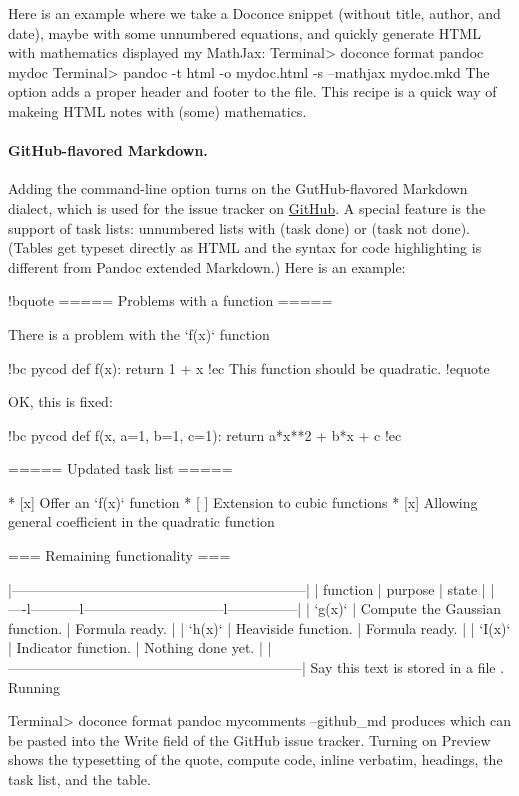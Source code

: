 \documentclass[%
oneside,                 %
final,                   %
10pt]{article}
\begin{document}
Here is an example where we take a Doconce snippet (without title, author,
and date), maybe with some unnumbered equations, and quickly generate
HTML with mathematics displayed my MathJax:
\bsys
Terminal> doconce format pandoc mydoc
Terminal> pandoc -t html -o mydoc.html -s --mathjax mydoc.mkd
\esys
The  option adds a proper header and footer to the  file.
This recipe is a quick way of makeing HTML notes with (some) mathematics.

\paragraph{GitHub-flavored Markdown.}
Adding the command-line option  turns on the GutHub-flavored
Markdown dialect, which is used for the issue tracker on \href{{http://github.com}}{GitHub}. A special feature is the support of task lists:
unnumbered lists with \code{[x]} (task done) or \code{[ ]} (task not done).
(Tables get typeset directly as HTML and the syntax for code highlighting
is different from Pandoc extended Markdown.) Here is an example:

\bccq
!bquote
===== Problems with a function =====

There is a problem with the `f(x)` function

!bc pycod
def f(x):
    return 1 + x
!ec
This function should be quadratic.
!equote

OK, this is fixed:

!bc pycod
def f(x, a=1, b=1, c=1):
    return a*x**2 + b*x + c
!ec

===== Updated task list =====

   * [x] Offer an `f(x)` function
   * [ ] Extension to cubic functions
   * [x] Allowing general coefficient in the quadratic function

=== Remaining functionality ===

|---------------------------------------------------------------|
| function | purpose                        | state |
|----l-----------l------------------------------l---------------|
|  `g(x)`  | Compute the Gaussian function. | Formula ready. |
|  `h(x)`  | Heaviside function.            | Formula ready. |
|  `I(x)`  | Indicator function.            | Nothing done yet. |
|---------------------------------------------------------------|
\eccq
Say this text is stored in a file . Running

\bsys
Terminal> doconce format pandoc mycomments --github_md
\esys
produces  which can be pasted into the Write field of
the GitHub issue tracker. Turning on Preview shows the typesetting of
the quote, compute code, inline verbatim, headings, the task list, and
the table.
\end{document}
